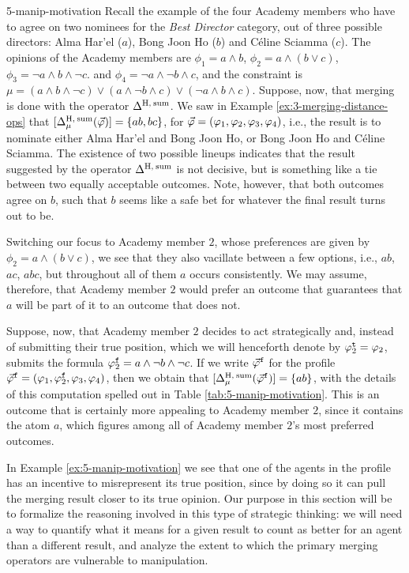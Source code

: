 \begin{xmpl}{}{5-manip-motivation}
	Recall the example of the four Academy members
	who have to agree on two nominees for the 
	\emph{Best Director} category, 
	out of three possible directors:
	Alma Har'el ($a$), Bong Joon Ho ($b$) and C\'eline Sciamma ($c$).
	The opinions of the Academy members are 
	$\phi_1 = a\land b$,
	$\phi_2 = a\land (b\lor c)$,
	$\phi_3 = \lnot a\land b \land \lnot c$.
	and
	$\phi_4 = \lnot a \land\lnot b\land c$,
	and the constraint is 
	$\mu=(a\land b\land \lnot c)\lor(a\land\lnot b\land c)\lor(\lnot a\land b\land c)$.
	Suppose, now, that merging is done with the operator $\me^{\hamming,\:\ssum}$.
	We saw in Example \ref{ex:3-merging-distance-ops}
	that $[\me^{\hamming,\:\ssum}_\mu(\P)]=\{ab,bc\}$,
	for $\P=(\phi_1,\phi_2,\phi_3,\phi_4)$,
	i.e., the result is to nominate either Alma Har'el and Bong Joon Ho,
	or Bong Joon Ho and C\'eline Sciamma.
	The existence of two possible lineups indicates that the result suggested 
	by the operator $\me^{\hamming,\:\ssum}$ is not decisive,
	but is something like a tie between two equally acceptable outcomes.
	Note, however, that both outcomes agree on $b$, such that 
	$b$ seems like a safe bet for whatever the final result turns out to be.

	Switching our focus to Academy member $2$, whose preferences are 
	given by $\phi_2 = a\land (b\lor c)$, we see that they also vacillate 
	between a few options, i.e., $ab$, $ac$, $abc$,
	but throughout all of them $a$ occurs consistently. 
	We may assume, therefore, that Academy member $2$ would prefer 
	an outcome that guarantees that $a$ will be part of it to
	an outcome that does not.

	Suppose, now, that Academy member $2$ decides to act strategically
	and, instead of submitting their true position,
	which we will henceforth denote by $\truth{\phi}_{2}=\phi_{2}$,
	submits the formula $\manip{\phi}_{2}=a\land\lnot b\land\lnot c$.
	If we write $\manip{\P}$ for the profile $\manip{\P}=(\phi_{1},\manip{\phi}_{2},\phi_3,\phi_4)$,
	then we obtain that $[\me^{\hamming,\:\ssum}_{\mu}(\manip{\P})]=\{ab\}$,
	with the details of this computation spelled out in Table \ref{tab:5-manip-motivation}.
	This is an outcome that is certainly more appealing to Academy member $2$,
	since it contains the atom $a$, which figures among all of 
	Academy member $2$'s most preferred outcomes.
\end{xmpl}

In Example \ref{ex:5-manip-motivation} we see that one of the 
agents in the profile has an incentive to misrepresent its 
true position, since by doing so it can pull the merging result
closer to its true opinion.
Our purpose in this section will be to formalize the reasoning 
involved in this type of strategic thinking:
we will need a way to quantify what it means for a given result to count 
as better for an agent than a different result,
and analyze the extent to which the primary merging operators 
are vulnerable to manipulation.

